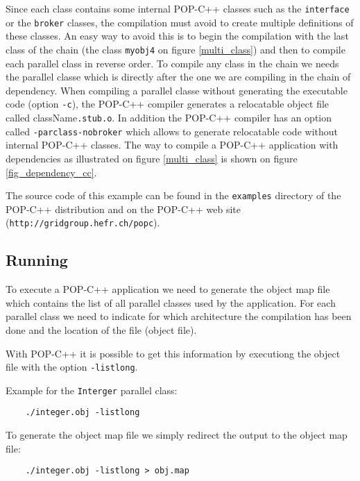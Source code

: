 Since each class contains some internal POP-C++ classes such as the
\texttt{interface} or the \texttt{broker} classes, the compilation must avoid
to create multiple definitions of these classes. An easy way to avoid this is to
begin the compilation with the last class of the chain (the class \texttt{myobj4}
on figure \ref{multi_class}) and then to compile each parallel class in reverse
order. To compile any class in the chain we needs the parallel classe which is
directly after the one we are compiling in the chain of dependency.
When compiling a parallel classe without generating the executable code
(option \texttt{-c}), the POP-C++ compiler generates a relocatable object file
called className\texttt{.stub.o}. In addition the POP-C++ compiler has an option
called \texttt{-parclass-nobroker} which allows to generate relocatable code
without internal POP-C++ classes.
The way to compile a POP-C++ application with dependencies as illustrated on figure \ref{multi_class} is shown on figure \ref{fig_dependency_cc}.

The source code of this example can be found in the \texttt{examples} directory
of the POP-C++ distribution and on the POP-C++ web site 
(\texttt{http://gridgroup.hefr.ch/popc}).



\subsection{Running}

To execute a POP-C++ application we need to generate the object map file which contains
the list of all parallel classes used by the application. For each parallel
class we need to indicate for which architecture the compilation has been done
and the location of the file (object file).

With POP-C++ it is possible to get this information by executiong the object file
with the option \texttt{-listlong}.

Example for the \texttt{Interger} parallel class:
\vspace{4mm}
\begin{verbatim}
    ./integer.obj -listlong
\end{verbatim}
\vspace{4mm} 

To generate the object map file we simply redirect the output to the object map file:
\vspace{4mm}
\begin{verbatim}
    ./integer.obj -listlong > obj.map
\end{verbatim}
\vspace{4mm}

